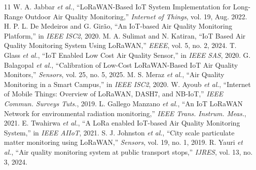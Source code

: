 \documentclass[conference]{IEEEtran}
\begin{document}
\begin{thebibliography}{11}
 W. A. Jabbar \emph{et al.}, ``LoRaWAN-Based IoT System Implementation for Long-Range Outdoor Air Quality Monitoring,'' \emph{Internet of Things}, vol. 19, Aug. 2022.
 H. P. L. De Medeiros and G. Girão, ``An IoT-based Air Quality Monitoring Platform,'' in \emph{IEEE ISC2}, 2020.
 M. A. Sulimat and N. Katiran, ``IoT Based Air Quality Monitoring System Using LoRaWAN,'' \emph{EEEE}, vol. 5, no. 2, 2024.
 T. Glass \emph{et al.}, ``IoT Enabled Low Cost Air Quality Sensor,'' in \emph{IEEE SAS}, 2020.
 G. Balagopal \emph{et al.}, ``Calibration of Low-Cost LoRaWAN-Based IoT Air Quality Monitors,'' \emph{Sensors}, vol. 25, no. 5, 2025.
 M. S. Meraz \emph{et al.}, ``Air Quality Monitoring in a Smart Campus,'' in \emph{IEEE ISC2}, 2020.
 W. Ayoub \emph{et al.}, ``Internet of Mobile Things: Overview of LoRaWAN, DASH7, and NB-IoT,'' \emph{IEEE Commun. Surveys Tuts.}, 2019.
 L. Gallego Manzano \emph{et al.}, ``An IoT LoRaWAN Network for environmental radiation monitoring,'' \emph{IEEE Trans. Instrum. Meas.}, 2021.
 E. Twahirwa \emph{et al.}, ``A LoRa enabled IoT-based Air Quality Monitoring System,'' in \emph{IEEE AIIoT}, 2021.
 S. J. Johnston \emph{et al.}, ``City scale particulate matter monitoring using LoRaWAN,'' \emph{Sensors}, vol. 19, no. 1, 2019.
 R. Yauri \emph{et al.}, ``Air quality monitoring system at public transport stops,'' \emph{IJRES}, vol. 13, no. 3, 2024.
\end{thebibliography}
\end{document}
